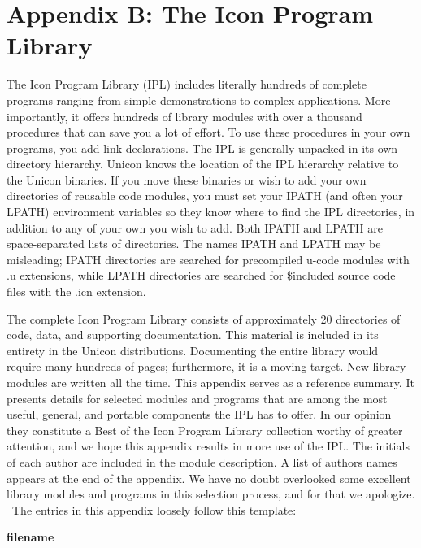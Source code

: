 \clearpage\section{Appendix B: The Icon Program Library}

The Icon Program Library (IPL) includes
literally hundreds of complete programs ranging from simple
demonstrations to complex applications. More importantly, it offers
hundreds of library modules with over a thousand procedures that can
save you a lot of effort. To use these procedures in your own programs,
you add link declarations. The IPL is generally unpacked in
its own directory hierarchy. Unicon knows the location of the IPL
hierarchy relative to the Unicon binaries. If you move these binaries
or wish to add your own directories of reusable code modules, you must
set your IPATH (and often your LPATH)
environment variables so they know
where to find the IPL directories, in addition to any of your own you
wish to add. Both IPATH and LPATH are space-separated lists of
directories. The names IPATH and LPATH may be misleading; IPATH
directories are searched for precompiled u-code modules with .u
extensions, while LPATH directories are searched for
\$include{\textquotesingle}d source code files with
the .icn extension.

The complete Icon Program Library consists of approximately 20
directories of code, data, and supporting documentation. This material
is included in its entirety in the Unicon distributions. Documenting
the entire library would require many hundreds of pages; furthermore,
it is a moving target. New library modules are written all the time.
This appendix serves as a reference summary. It presents details for
selected modules and programs that are among the most useful, general,
and portable components the IPL has to offer. In our opinion they
constitute a {\textquotedbl}Best of the Icon Program
Library{\textquotedbl} collection worthy of greater attention, and we
hope this appendix results in more use of the IPL. The initials of each
author are included in the module description. A list of
authors{\textquotesingle} names appears at the end of the appendix. We
have no doubt overlooked some excellent library modules and programs in
this selection process, and for that we apologize. \ The entries in
this appendix loosely follow this template:

{\sffamily\bfseries
filename}

